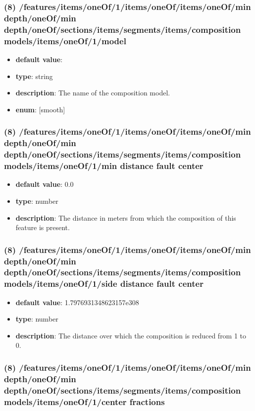 \subsubsection{(8) /features/items/oneOf/1/items/oneOf/items/oneOf/min depth/oneOf/min depth/oneOf/sections/items/segments/items/composition models/items/oneOf/1/model}
\begin{itemize}[leftmargin=8em]\item {\bf default value}: 
\item {\bf type}: string
\item {\bf description}: The name of the composition model.
\item {\bf enum}: [smooth]\end{itemize}\subsubsection{(8) /features/items/oneOf/1/items/oneOf/items/oneOf/min depth/oneOf/min depth/oneOf/sections/items/segments/items/composition models/items/oneOf/1/min distance fault center}
\begin{itemize}[leftmargin=8em]\item {\bf default value}: 0.0
\item {\bf type}: number
\item {\bf description}: The distance in meters from which the composition of this feature is present.
\end{itemize}\subsubsection{(8) /features/items/oneOf/1/items/oneOf/items/oneOf/min depth/oneOf/min depth/oneOf/sections/items/segments/items/composition models/items/oneOf/1/side distance fault center}
\begin{itemize}[leftmargin=8em]\item {\bf default value}: 1.7976931348623157e308
\item {\bf type}: number
\item {\bf description}: The distance over which the composition is reduced from 1 to 0.
\end{itemize}\subsubsection{(8) /features/items/oneOf/1/items/oneOf/items/oneOf/min depth/oneOf/min depth/oneOf/sections/items/segments/items/composition models/items/oneOf/1/center fractions}
